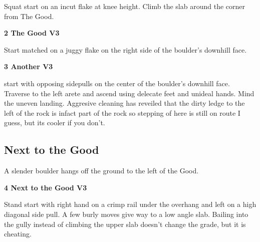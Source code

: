 \begin{multicols}{2}
			\begin{adjustwidth}{0.5cm}{}			
			Squat start on an incut flake at knee height. Climb the slab around the corner from The Good.
			\end{adjustwidth}
			
			
			
			\needspace{1.5cm}
\label{rt:The Good}
\colorbox{green!20}{
\parbox{0.95\linewidth}{
\textbf{
2 The Good V3  
}}}

			\begin{adjustwidth}{0.5cm}{}			
			Start matched on a juggy flake on the right side of the boulder's downhill face.
			\end{adjustwidth}
			
			
			
			\needspace{1.5cm}
\label{rt:Another}
\colorbox{green!20}{
\parbox{0.95\linewidth}{
\textbf{
3 Another V3  \warn
}}}

			\begin{adjustwidth}{0.5cm}{}			
			start with opposing sidepulls on the center of the boulder's downhill face. Traverse to the left arete and ascend using delecate feet and unideal hands. Mind the uneven landing. Aggresive cleaning has reveiled that the dirty ledge to the left of the rock is infact part of the rock so stepping of here is still on route I guess, but its cooler if you don't.
			\end{adjustwidth}
			
			
		
		
		\needspace{1.5cm}
		\subsection*{Next to the Good}\label{bf:Next to the Good}
		A slender boulder hangs off the ground to the left of the Good.\\
	
		
			
			\needspace{1.5cm}
\label{rt:Next to the Good}
\colorbox{green!20}{
\parbox{0.95\linewidth}{
\textbf{
4 Next to the Good V3  \warn
}}}

			\begin{adjustwidth}{0.5cm}{}			
			Stand start with right hand on a crimp rail under the overhang and left on a high diagonal side pull. A few burly moves give way to a low angle slab. Bailing into the gully instead of climbing the upper slab doesn't change the grade, but it is cheating.
			\end{adjustwidth}
			

\end{multicols}
